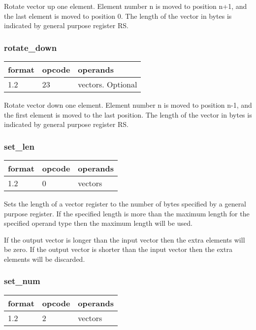 \documentclass[forwardcom.tex]{subfiles}
\begin{document}
Rotate vector up one element. Element number n is moved to position n+1, and the last element is moved to position 0. The length of the vector in bytes is indicated by general purpose register RS.

\subsubsection{rotate\_down}
\label{table:rotateDownInstruction}
\begin{tabular}{|p{12mm}|p{12mm}|p{110mm}|}
\hline
\bfseries format & \bfseries opcode & \bfseries operands \\ \hline
1.2 & 23 & vectors. Optional \\ \hline
\end{tabular}
\vspace{2mm}

Rotate vector down one element. Element number n is moved to position n-1, and the first element is moved to the last position. The length of the vector in bytes is indicated by general purpose register RS.

\subsubsection{set\_len}
\label{table:setLenInstruction}
\begin{tabular}{|p{12mm}|p{12mm}|p{110mm}|}
\hline
\bfseries format & \bfseries opcode & \bfseries operands \\ \hline
1.2 & 0 & vectors \\ \hline
\end{tabular}
\vspace{2mm}

Sets the length of a vector register to the number of bytes specified by a general purpose register. If the specified length is more than the maximum length for the specified operand type then the maximum length will be used.
\vspace{2mm}

If the output vector is longer than the input vector then the extra elements will be zero. If the output vector is shorter than the input vector then the extra elements will be discarded. 


\subsubsection{set\_num}
\label{table:setNumInstruction}
\begin{tabular}{|p{12mm}|p{12mm}|p{110mm}|}
\hline
\bfseries format & \bfseries opcode & \bfseries operands \\ \hline
1.2 & 2 & vectors \\ \hline
\end{tabular}
\vspace{2mm}
\end{document}
